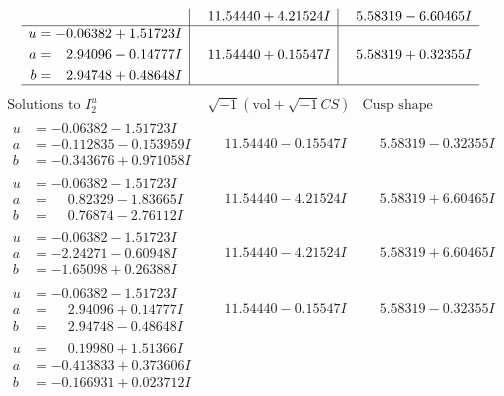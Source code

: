 \documentclass[1p]{elsarticle_modified}
\theoremstyle{definition}
\newcommand{\I}{\sqrt{-1}}
\begin{document}
$$\begin{array}{c|c|c}
 & \phantom{-}11.54440 + 4.21524 I & \phantom{-}5.58319 - 6.60465 I \\ \hline\begin{aligned}
u &= -0.06382 + 1.51723 I \\
a &= \phantom{-}2.94096 - 0.14777 I \\
b &= \phantom{-}2.94748 + 0.48648 I\end{aligned}
 & \phantom{-}11.54440 + 0.15547 I & \phantom{-}5.58319 + 0.32355 I\\
 \hline 
 \end{array}$$\newpage$$\begin{array}{c|c|c}  
\text{Solutions to }I^u_{2}& \I (\text{vol} + \sqrt{-1}CS) & \text{Cusp shape}\\
 \hline 
\begin{aligned}
u &= -0.06382 - 1.51723 I \\
a &= -0.112835 - 0.153959 I \\
b &= -0.343676 + 0.971058 I\end{aligned}
 & \phantom{-}11.54440 - 0.15547 I & \phantom{-}5.58319 - 0.32355 I \\ \hline\begin{aligned}
u &= -0.06382 - 1.51723 I \\
a &= \phantom{-}0.82329 - 1.83665 I \\
b &= \phantom{-}0.76874 - 2.76112 I\end{aligned}
 & \phantom{-}11.54440 - 4.21524 I & \phantom{-}5.58319 + 6.60465 I \\ \hline\begin{aligned}
u &= -0.06382 - 1.51723 I \\
a &= -2.24271 - 0.60948 I \\
b &= -1.65098 + 0.26388 I\end{aligned}
 & \phantom{-}11.54440 - 4.21524 I & \phantom{-}5.58319 + 6.60465 I \\ \hline\begin{aligned}
u &= -0.06382 - 1.51723 I \\
a &= \phantom{-}2.94096 + 0.14777 I \\
b &= \phantom{-}2.94748 - 0.48648 I\end{aligned}
 & \phantom{-}11.54440 - 0.15547 I & \phantom{-}5.58319 - 0.32355 I \\ \hline\begin{aligned}
u &= \phantom{-}0.19980 + 1.51366 I \\
a &= -0.413833 + 0.373606 I \\
b &= -0.166931 + 0.023712 I\end{aligned}

\end{array}$$
\end{document}
